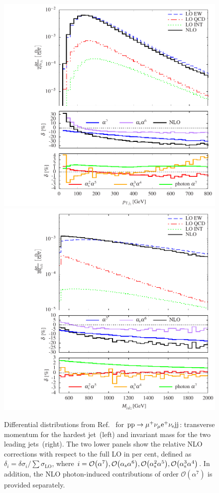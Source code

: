 \begin{figure}
\includegraphics[width=.47\textwidth]{WG1_plots/histogram_transverse_momentum_j1}
\hfill
\includegraphics[width=.47\textwidth]{WG1_plots/histogram_invariant_mass_mjj12}
\caption{Differential distributions from Ref.~\cite{Biedermann:2017bss} for ${\rm p}{\rm p}\to\mu^+\nu_\mu{\rm e}^+\nu_{\rm e}{\rm j}{\rm j}$:
transverse momentum for the hardest jet~(left) and invariant mass for the two leading jets~(right).
The two lower panels show the relative NLO corrections with respect to the full LO in per cent,
defined as $\delta_i = \delta \sigma_{i} / \sum \sigma_{\text{LO}}$, 
where $i=\mathcal{O}{\left(\alpha^{7}\right)},\mathcal{O}{\left(\alpha_{\rm s}\alpha^{6}\right)},\mathcal{O}{\left(\alpha_{\rm s}^2\alpha^{5}\right)},\mathcal{O}{\left(\alpha_{\rm s}^3\alpha^{4}\right)}$.
In addition, the NLO photon-induced contributions of order $\mathcal{O}{\left(\alpha^{7}\right)}$ is provided separately.}
\label{fig:VBSALL}
\end{figure}


